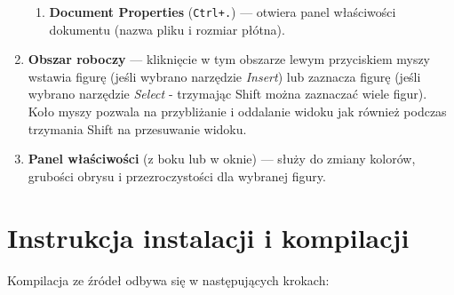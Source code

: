 \documentclass[a4paper,12pt]{article}
\begin{document}
\begin{enumerate}
\begin{enumerate}[label=\alph*)]
        \item \textbf{Document Properties} (\texttt{Ctrl+.}) — otwiera panel właściwości dokumentu (nazwa pliku i rozmiar płótna).
    \end{enumerate}
    \item \textbf{Obszar roboczy} — kliknięcie w tym obszarze lewym przyciskiem
      myszy wstawia figurę (jeśli wybrano narzędzie \emph{Insert}) lub zaznacza
      figurę (jeśli wybrano narzędzie \emph{Select} - trzymając Shift można
      zaznaczać wiele figur). Koło myszy pozwala na przybliżanie i oddalanie
      widoku jak również podczas trzymania Shift na przesuwanie widoku.
    \item \textbf{Panel właściwości} (z boku lub w oknie) — służy do zmiany 
    kolorów, grubości obrysu i przezroczystości dla wybranej figury.
\end{enumerate}

\section{Instrukcja instalacji i kompilacji}

Kompilacja ze źródeł odbywa się w następujących krokach:
\end{document}
